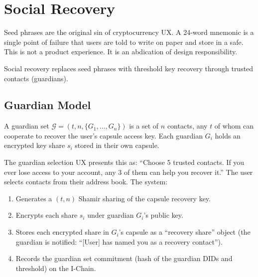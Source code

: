 

\section{Social Recovery}
\label{sec:recovery}

Seed phrases are the original sin of cryptocurrency UX. A 24-word mnemonic
is a single point of failure that users are told to write on paper and store
in a safe. This is not a product experience. It is an abdication of design
responsibility.

Social recovery replaces seed phrases with threshold key recovery through
trusted contacts (guardians).

\subsection{Guardian Model}

\begin{definition}
A guardian set $\mathcal{G} = (t, n, \{G_1, \ldots, G_n\})$ is a set of
$n$ contacts, any $t$ of whom can cooperate to recover the user's capsule
access key. Each guardian $G_i$ holds an encrypted key share $s_i$ stored
in their own capsule.
\end{definition}

The guardian selection UX presents this as: ``Choose 5 trusted contacts.
If you ever lose access to your account, any 3 of them can help you
recover it.'' The user selects contacts from their address book. The
system:

\begin{enumerate}
    \item Generates a $(t, n)$ Shamir sharing of the capsule recovery key.
    \item Encrypts each share $s_i$ under guardian $G_i$'s public key.
    \item Stores each encrypted share in $G_i$'s capsule as a ``recovery
    share'' object (the guardian is notified: ``[User] has named you as
    a recovery contact'').
    \item Records the guardian set commitment (hash of the guardian DIDs
    and threshold) on the I-Chain.
\end{enumerate}

